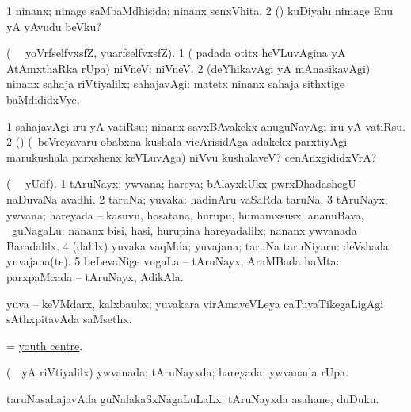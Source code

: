 \noindent
\gl{\pagu} 
\bmng
\bnum
\num{1}  ninanx; ninage saMbaMdhisida:  ninanx senxVhita. 
\num{2}  (\AmA) kuDiyalu nimage Enu yA yAvudu beVku?
\enum
\emng
\eentry



\bentry
{} 
\gl{\sanA} 
\bmng
(\bava\  \ucAcx\ yoVrfselfvxsfZ, yuarfselfvxsfZ). 
\bnum
\num{1} ( padada otitx heVLuvAgina yA AtAmxthaRka rUpa) niVneV:  niVneV. 
\num{2} (deYhikavAgi yA mAnasikavAgi) ninanx sahaja riVtiyalilx; sahajavAgi:  matetx ninanx sahaja sithxtige baMdididxVye.
\enum
\emng         

\noindent
\gl{\pagu} 
\bmng
\bnum
\num{1}  sahajavAgi iru yA vatiRsu; ninanx  savxBAvakekx anuguNavAgi iru yA vatiRsu. 
\num{2}  (\ashi) (\kanmu\ beVreyavaru obabxna kushala vicArisidAga adakekx parxtiyAgi marukushala parxshenx keVLuvAga) niVvu kushalaveV? cenAnxgididxVrA?
\enum
\emng
\eentry

\bentry
{} 
\gl{\nA} 
\bmng
(\bava\  \ucAcx\ yUdf). 
\bnum
\num{1} tAruNayx; ywvana; hareya; bAlayxkUkx pwrxDhadashegU naDuvaNa avadhi. 
\num{2} taruNa; yuvaka:  hadinAru vaSaRda taruNa. 
\num{3} tAruNayx; ywvana; hareyada -- kasuvu, hosatana, hurupu, humamxsusx, ananuBava, \mo\ guNagaLu:  nananx bisi, hasi, hurupina hareyadalilx; nananx ywvanada Baradalilx.  
\num{4} (\bava dalilx) yuvaka vaqMda; yuvajana; taruNa taruNiyaru:  deVshada yuvajana(te). 
\num{5} beLevaNige \mo vugaLa -- tAruNayx, AraMBada haMta:  parxpaMcada -- tAruNayx, AdikAla.
\enum
\emng
\eentry

\bentry
{}
\gl{\nA}
\bmng
yuva -- keVMdarx, kalxbaubx; yuvakara virAmaveVLeya caTuvaTikegaLigAgi sAthxpitavAda saMsethx.
\emng
\eentry

\bentry
{}
\gl{\nA} 
\bmng
= \hyperlink{youth centre}{youth centre}.
\emng
\eentry

\bentry
{} 
\gl{\gu} 
\bmng
(\kanmu\ \rUpa\ yA riVtiyalilx) 
\banum
{} ywvanada; tAruNayxda; hareyada:  ywvanada rUpa. 

 taruNasahajavAda guNalakaSxNagaLuLaLx:  tAruNayxda asahane, duDuku. 

